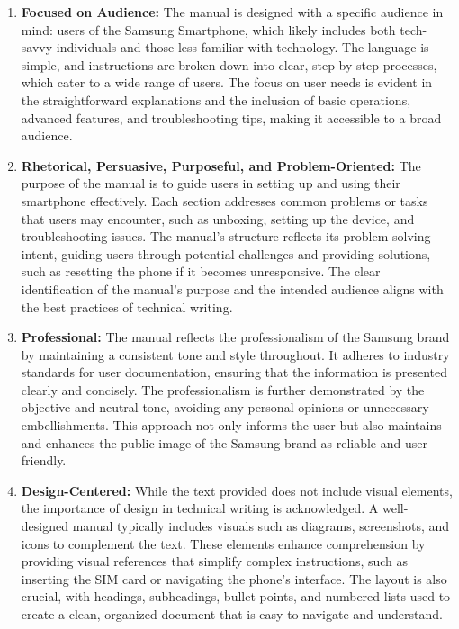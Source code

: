 \documentclass{article}
\begin{document}
\begin{enumerate}
    \item \textbf{Focused on Audience:} The manual is designed with a specific audience in mind: users of the Samsung Smartphone, which likely includes both tech-savvy individuals and those less familiar with technology. The language is simple, and instructions are broken down into clear, step-by-step processes, which cater to a wide range of users. The focus on user needs is evident in the straightforward explanations and the inclusion of basic operations, advanced features, and troubleshooting tips, making it accessible to a broad audience.
    
    \item \textbf{Rhetorical, Persuasive, Purposeful, and Problem-Oriented:} The purpose of the manual is to guide users in setting up and using their smartphone effectively. Each section addresses common problems or tasks that users may encounter, such as unboxing, setting up the device, and troubleshooting issues. The manual's structure reflects its problem-solving intent, guiding users through potential challenges and providing solutions, such as resetting the phone if it becomes unresponsive. The clear identification of the manual’s purpose and the intended audience aligns with the best practices of technical writing.
    
    \item \textbf{Professional:} The manual reflects the professionalism of the Samsung brand by maintaining a consistent tone and style throughout. It adheres to industry standards for user documentation, ensuring that the information is presented clearly and concisely. The professionalism is further demonstrated by the objective and neutral tone, avoiding any personal opinions or unnecessary embellishments. This approach not only informs the user but also maintains and enhances the public image of the Samsung brand as reliable and user-friendly.
    
    \item \textbf{Design-Centered:} While the text provided does not include visual elements, the importance of design in technical writing is acknowledged. A well-designed manual typically includes visuals such as diagrams, screenshots, and icons to complement the text. These elements enhance comprehension by providing visual references that simplify complex instructions, such as inserting the SIM card or navigating the phone’s interface. The layout is also crucial, with headings, subheadings, bullet points, and numbered lists used to create a clean, organized document that is easy to navigate and understand.
    

\end{enumerate}
\end{document}
